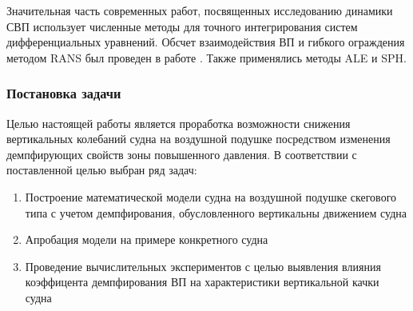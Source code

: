 Значительная часть современных работ, посвященных исследованию динамики СВП использует численные методы для точного интегрирования систем дифференциальных уравнений. Обсчет взаимодействия ВП и гибкого ограждения методом RANS был проведен в работе \cite{cole2018numerical}. Также применялись методы ALE\cite{challa2013finite} и SPH\cite{ozbulut2014numerical}.

\begin{centering}
    \subsubsection*{Постановка задачи}
\end{centering}

Целью настоящей работы является проработка возможности снижения вертикальных колебаний судна на воздушной подушке посредством изменения демпфирующих свойств зоны повышенного давления. В соответствии с поставленной целью выбран ряд задач:
\vspace*{5mm}
\begin{enumerate}
    \item Построение математической модели судна на воздушной подушке скегового типа с учетом демпфирования, обусловленного вертикальны движением судна
    \item Апробация модели на примере конкретного судна
    \item Проведение вычислительных экспериментов с целью выявления влияния коэффицента демпфирования ВП на характеристики вертикальной качки судна
\end{enumerate}